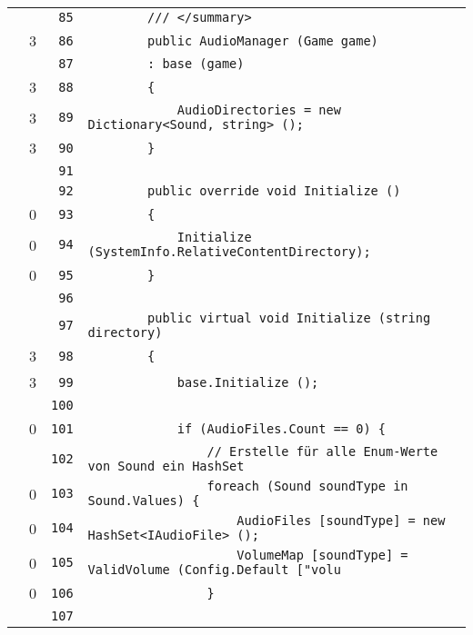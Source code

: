 \documentclass[a4paper,10pt]{article}
\begin{document}
\begin{longtable}[l]{lrrl}
\cellcolor{gray} &  & \verb~85~ & \verb~        /// </summary>~\\
\cellcolor{green} & 3 & \verb~86~ & \verb~        public AudioManager (Game game)~\\
\cellcolor{gray} &  & \verb~87~ & \verb~        : base (game)~\\
\cellcolor{green} & 3 & \verb~88~ & \verb~        {~\\
\cellcolor{green} & 3 & \verb~89~ & \verb~            AudioDirectories = new Dictionary<Sound, string> ();~\\
\cellcolor{green} & 3 & \verb~90~ & \verb~        }~\\
\cellcolor{gray} &  & \verb~91~ & \verb~~\\
\cellcolor{gray} &  & \verb~92~ & \verb~        public override void Initialize ()~\\
\cellcolor{red} & 0 & \verb~93~ & \verb~        {~\\
\cellcolor{red} & 0 & \verb~94~ & \verb~            Initialize (SystemInfo.RelativeContentDirectory);~\\
\cellcolor{red} & 0 & \verb~95~ & \verb~        }~\\
\cellcolor{gray} &  & \verb~96~ & \verb~~\\
\cellcolor{gray} &  & \verb~97~ & \verb~        public virtual void Initialize (string directory)~\\
\cellcolor{green} & 3 & \verb~98~ & \verb~        {~\\
\cellcolor{green} & 3 & \verb~99~ & \verb~            base.Initialize ();~\\
\cellcolor{gray} &  & \verb~100~ & \verb~~\\
\cellcolor{red} & 0 & \verb~101~ & \verb~            if (AudioFiles.Count == 0) {~\\
\cellcolor{gray} &  & \verb~102~ & \verb~                // Erstelle für alle Enum-Werte von Sound ein HashSet~\\
\cellcolor{red} & 0 & \verb~103~ & \verb~                foreach (Sound soundType in Sound.Values) {~\\
\cellcolor{red} & 0 & \verb~104~ & \verb~                    AudioFiles [soundType] = new HashSet<IAudioFile> ();~\\
\cellcolor{red} & 0 & \verb~105~ & \verb~                    VolumeMap [soundType] = ValidVolume (Config.Default ["volu~\\
\cellcolor{red} & 0 & \verb~106~ & \verb~                }~\\
\cellcolor{gray} &  & \verb~107~ & \verb~~\\

\end{longtable}
\end{document}
